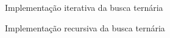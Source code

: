 

\begin{frame}[fragile]{Implementação iterativa da busca ternária}
\end{frame}

\begin{frame}[fragile]{Implementação recursiva da busca ternária}
\end{frame}
